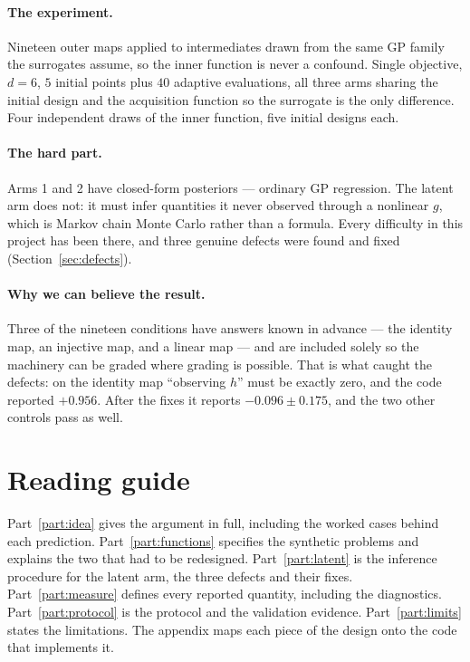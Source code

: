 \documentclass[11pt]{article}
\begin{document}
\paragraph{The experiment.} Nineteen outer maps applied to intermediates drawn
from the same GP family the surrogates assume, so the inner function is never a
confound. Single objective, $d=6$, $5$ initial points plus $40$ adaptive
evaluations, all three arms sharing the initial design and the acquisition
function so the surrogate is the only difference. Four independent draws of the
inner function, five initial designs each.

\paragraph{The hard part.} Arms 1 and 2 have closed-form posteriors --- ordinary
GP regression. The latent arm does not: it must infer quantities it never
observed through a nonlinear $g$, which is Markov chain Monte Carlo rather than
a formula. Every difficulty in this project has been there, and three genuine
defects were found and fixed (Section~\ref{sec:defects}).

\paragraph{Why we can believe the result.} Three of the nineteen conditions have
answers known in advance --- the identity map, an injective map, and a linear
map --- and are included solely so the machinery can be graded where grading is
possible. That is what caught the defects: on the identity map ``observing $h$''
must be exactly zero, and the code reported $+0.956$. After the fixes it
reports $-0.096\pm0.175$, and the two other controls pass as well.

\section{Reading guide}

Part~\ref{part:idea} gives the argument in full, including the worked cases
behind each prediction. Part~\ref{part:functions} specifies the synthetic
problems and explains the two that had to be redesigned. Part~\ref{part:latent}
is the inference procedure for the latent arm, the three defects and their
fixes. Part~\ref{part:measure} defines every reported quantity, including the
diagnostics. Part~\ref{part:protocol} is the protocol and the validation
evidence. Part~\ref{part:limits} states the limitations. The appendix maps each
piece of the design onto the code that implements it.
\end{document}
